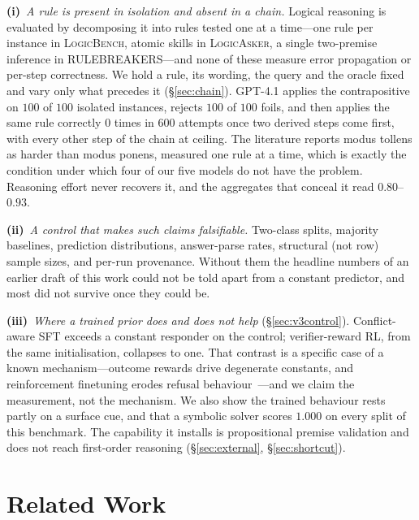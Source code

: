 \documentclass{article}
\begin{document}
\textbf{(i)}~\emph{A rule is present in isolation and absent in a chain.}
Logical reasoning is evaluated by decomposing it into rules tested one at a
time---one rule per instance in \textsc{LogicBench}, atomic skills in
\textsc{LogicAsker}, a single two-premise inference in
\textsc{RULEBREAKERS}---and none of these measure error propagation or per-step
correctness. We hold a rule, its wording, the query and the oracle fixed and
vary only what precedes it (\S\ref{sec:chain}). GPT-4.1 applies the
contrapositive on $100$ of $100$ isolated instances, rejects $100$ of $100$
foils, and then applies the same rule correctly $0$ times in $600$ attempts
once two derived steps come first, with every other step of the chain at
ceiling. The literature reports modus tollens as harder than modus ponens,
measured one rule at a time, which is exactly the condition under which four of
our five models do not have the problem. Reasoning effort never recovers it,
and the aggregates that conceal it read $0.80$--$0.93$.

\textbf{(ii)}~\emph{A control that makes such claims falsifiable.} Two-class
splits, majority baselines, prediction distributions, answer-parse rates,
structural (not row) sample sizes, and per-run provenance. Without them the
headline numbers of an earlier draft of this work could not be told apart from a
constant predictor, and most did not survive once they could be.

\textbf{(iii)}~\emph{Where a trained prior does and does not help}
(\S\ref{sec:v3control}). Conflict-aware SFT exceeds a constant responder on the
control; verifier-reward RL, from the same initialisation, collapses to one. That contrast is a specific case of a
known mechanism---outcome rewards drive degenerate constants, and reinforcement
finetuning erodes refusal behaviour~\citep{song2025hallucinationtax}---and we
claim the measurement, not the mechanism. We also show the trained behaviour
rests partly on a surface cue, and that a symbolic solver scores $1.000$ on
every split of this benchmark. The capability it installs is propositional
premise validation and does not reach first-order reasoning
(\S\ref{sec:external}, \S\ref{sec:shortcut}).

\section{Related Work}
\end{document}
